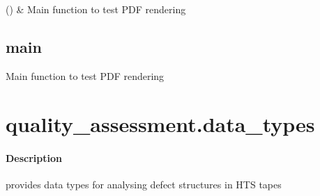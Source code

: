 \documentclass[letterpaper,10pt,english]{sphinxmanual}
\begin{document}
\begin{savenotes}\sphinxatlongtablestart\begin{longtable}[c]{}
\hline

\endfirsthead

%
{}\\
\hline

\endhead

\hline
{}\\
\endfoot

\endlastfoot

\sphinxAtStartPar
{\hyperref[\detokenize{generated/quality_assessment.quality_pdf_report.main:quality_assessment.quality_pdf_report.main}]{}}()
&
\sphinxAtStartPar
Main function to test PDF rendering
\\
\hline
\end{longtable}\sphinxatlongtableend\end{savenotes}


\section{main}
\label{\detokenize{generated/quality_assessment.quality_pdf_report.main:main}}\label{\detokenize{generated/quality_assessment.quality_pdf_report.main::doc}}

\begin{fulllineitems}
\label{\detokenize{generated/quality_assessment.quality_pdf_report.main:quality_assessment.quality_pdf_report.main}}
\sphinxAtStartPar
Main function to test PDF rendering

\end{fulllineitems}



\chapter{quality\_assessment.data\_types}
\label{\detokenize{generated/quality_assessment.data_types:quality-assessment-data-types}}\label{\detokenize{generated/quality_assessment.data_types::doc}}\subsubsection*{Description}
\label{\detokenize{generated/quality_assessment.data_types:module-quality_assessment.data_types}}
\sphinxAtStartPar
provides data types for analysing defect structures in HTS tapes
\end{document}
